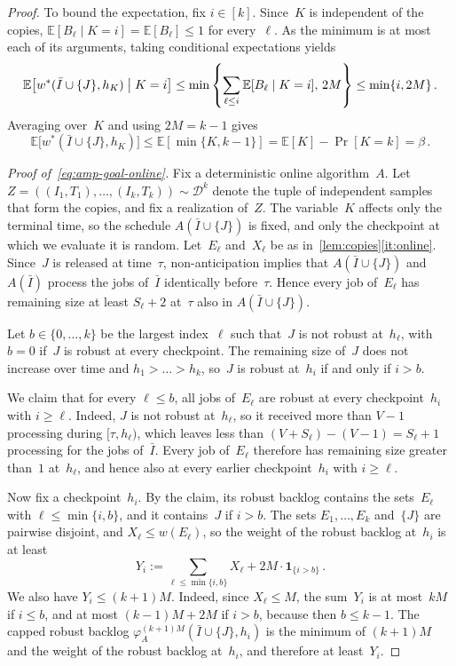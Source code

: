 \documentclass[11pt,letterpaper]{article}
\theoremstyle{definition}
\theoremstyle{remark}
\newcommand{\bone}{\mathbf{1}}
\newcommand{\E}{\mathbb{E}}
\newcommand{\cD}{\mathcal{D}}
\begin{document}
\begin{proof}
To bound the expectation, fix $i\in[k]$. Since~$K$ is independent of the copies, $\E[B_\ell\mid K=i]=\E[B_\ell]\le1$ for every~$\ell$. As the minimum is at most each of its arguments, taking conditional expectations yields
\begin{equation*}
  \E\bigl[w^*(\bar I\cup\{J\},h_K)\bigm|K=i\bigr]\le\min\left\{\sum_{\ell\le i}\E[B_\ell\mid K=i],\,2M\right\}\le\min\{i,2M\}\,.
\end{equation*}
Averaging over~$K$ and using $2M=k-1$ gives
\begin{equation*}
  \E\bigl[w^*(\bar I\cup\{J\},h_K)\bigr]\le\E[\min\{K,k-1\}]=\E[K]-\Pr[K=k]=\beta\,.
\end{equation*}


\emph{Proof of~\eqref{eq:amp-goal-online}.} Fix a deterministic online algorithm~$A$. Let $Z=((I_1,T_1),\dots,(I_k,T_k))\sim\cD^k$ denote the tuple of independent samples that form the copies, and fix a realization of~$Z$. The variable~$K$ affects only the terminal time, so the schedule $A(\bar I\cup\{J\})$ is fixed, and only the checkpoint at which we evaluate it is random. Let~$E_\ell$ and~$X_\ell$ be as in~\cref{lem:copies}\ref{it:online}. Since~$J$ is released at time~$\tau$, non-anticipation implies that $A(\bar I\cup\{J\})$ and $A(\bar I)$ process the jobs of~$\bar I$ identically before~$\tau$. Hence every job of~$E_\ell$ has remaining size at least $S_\ell+2$ at~$\tau$ also in $A(\bar I\cup\{J\})$.

Let $b\in\{0,\dots,k\}$ be the largest index~$\ell$ such that~$J$ is not robust at~$h_\ell$, with $b=0$ if~$J$ is robust at every checkpoint. The remaining size of~$J$ does not increase over time and $h_1>\dots>h_k$, so~$J$ is robust at~$h_i$ if and only if $i>b$.

We claim that for every $\ell\le b$, all jobs of~$E_\ell$ are robust at every checkpoint~$h_i$ with $i\ge \ell$. Indeed, $J$ is not robust at~$h_\ell$, so it received more than $V-1$ processing during $[\tau,h_\ell)$, which leaves less than $(V+S_\ell)-(V-1)=S_\ell+1$ processing for the jobs of~$\bar I$. Every job of~$E_\ell$ therefore has remaining size greater than~$1$ at~$h_\ell$, and hence also at every earlier checkpoint~$h_i$ with $i\ge \ell$.

Now fix a checkpoint~$h_i$. By the claim, its robust backlog contains the sets~$E_\ell$ with $\ell\le\min\{i,b\}$, and it contains~$J$ if $i>b$. The sets $E_1,\dots,E_k$ and~$\{J\}$ are pairwise disjoint, and $X_\ell\le w(E_\ell)$, so the weight of the robust backlog at~$h_i$ is at least
\begin{equation*}
  Y_i:=\sum_{\ell\le\min\{i,b\}}X_\ell+2M\cdot\bone_{\{i>b\}}\,.
\end{equation*}
We also have $Y_i\le(k+1)M$. Indeed, since $X_\ell\le M$, the sum~$Y_i$ is at most~$kM$ if $i\le b$, and at most $(k-1)M+2M$ if $i>b$, because then $b\le k-1$. The capped robust backlog $\varphi_A^{(k+1)M}(\bar I\cup\{J\},h_i)$ is the minimum of $(k+1)M$ and the weight of the robust backlog at~$h_i$, and therefore at least~$Y_i$.


\end{proof}
\end{document}
